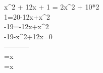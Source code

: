 x^2 + 12x + 1 = 2x^2 + 10*2\\
1=20-12\cdot x+x^2\\
-19=-12\cdot x+x^2\\
-19-x^2+12\cdot x=0\\
-----------\\
=x\\
=x
